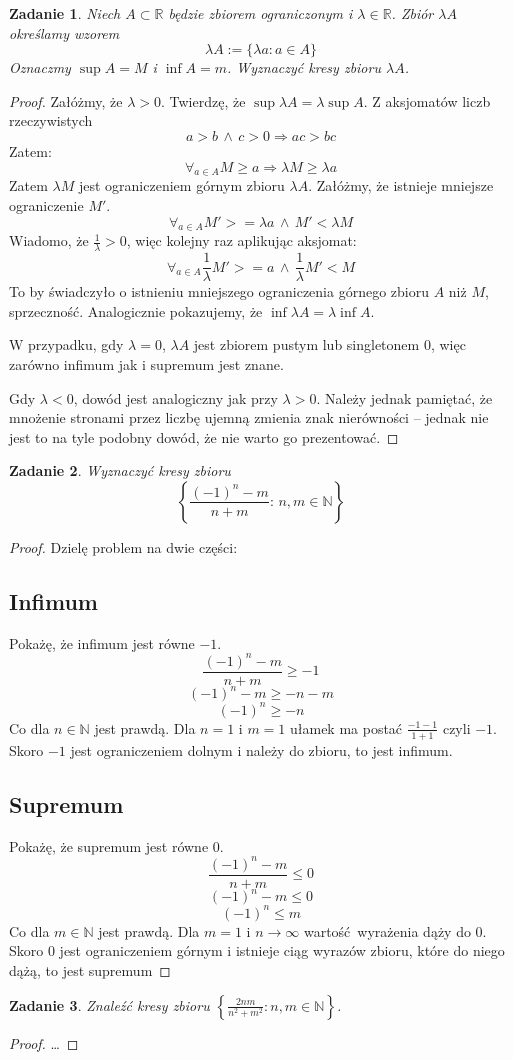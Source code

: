 \documentclass{article}
\newtheorem{problem}{Zadanie}
\begin{document}
\begin{problem}
    Niech $A \subset \mathbb{R}$ będzie zbiorem ograniczonym i
    $\lambda \in \mathbb{R}$. Zbiór $\lambda A$ określamy wzorem
    $$ \lambda A := \{ \lambda a : a \in A \} $$
    Oznaczmy $\sup A = M$ i $\inf A = m$. Wyznaczyć kresy zbioru
    $\lambda A$.
\end{problem}
\begin{proof}
    Załóżmy, że $\lambda > 0$.
    Twierdzę, że $\sup \lambda A = \lambda \sup A$.
    Z aksjomatów liczb rzeczywistych
    $$ a > b \,\wedge\, c > 0 \Rightarrow ac > bc $$
    Zatem:
    $$ \forall_{a \in A} M \geq a \Rightarrow \lambda M \geq \lambda a$$
    Zatem $\lambda M$ jest ograniczeniem górnym zbioru $\lambda A$.
    Załóżmy, że istnieje mniejsze ograniczenie $M'$.
    $$ \forall_{a \in A} M' >= \lambda a \,\wedge\, M' < \lambda M $$
    Wiadomo, że $\frac{1}{\lambda} > 0$, więc kolejny raz aplikując aksjomat:
    $$ \forall_{a \in A} \frac{1}{\lambda}M' >= a \,\wedge\, \frac{1}{\lambda}M' < M $$
    To by świadczyło o istnieniu mniejszego ograniczenia górnego zbioru $A$ niż
    $M$, sprzeczność. Analogicznie pokazujemy, że $\inf \lambda A = \lambda \inf A$.

    W przypadku, gdy $\lambda = 0$, $\lambda A $ jest zbiorem pustym lub
    singletonem $0$, więc zarówno infimum jak i supremum jest znane.

    Gdy $\lambda < 0$, dowód jest analogiczny jak przy $\lambda > 0$.
    Należy jednak pamiętać, że mnożenie stronami przez liczbę ujemną
    zmienia znak nierówności -- jednak nie jest to na tyle podobny dowód, że
    nie warto go prezentować.
\end{proof}

\begin {problem}
Wyznaczyć kresy zbioru
$$ \left\{ \frac{(-1)^n - m}{n + m} : \, n,m \in \mathbb{N} \right\} $$
\end{problem}
\begin{proof}
Dzielę problem na dwie części:\\
\subsection{Infimum}
Pokażę, że infimum jest równe $-1$.
$$ \frac{(-1)^n - m}{n + m} \geq -1$$
$$ (-1)^n - m \geq -n - m$$
$$ (-1)^n \geq -n $$
Co dla $n \in \mathbb{N}$ jest prawdą.
Dla $n = 1$ i $m = 1$ ułamek ma postać $ \frac{-1 - 1}{1 + 1} $ czyli $-1$.
Skoro $-1$ jest ograniczeniem dolnym i należy do zbioru, to jest infimum.
\subsection{Supremum}
Pokażę, że supremum jest równe $0$.
$$ \frac{(-1)^n - m}{n + m} \leq 0$$
$$ (-1)^n - m \leq 0$$
$$ (-1)^n \leq m$$
Co dla $m \in \mathbb{N}$ jest prawdą.
Dla $m = 1$ i $n \to \infty$ wartość wyrażenia dąży do $0$.
Skoro $0$ jest ograniczeniem górnym i istnieje ciąg wyrazów zbioru, które
do niego dążą, to jest supremum
\end{proof}

\begin{problem}
Znaleźć kresy zbioru $ \left\{ \frac{2nm}{n^2 + m^2} : n,m \in \mathbb{N}\right\}$.
\end{problem}
\begin{proof}
\dots
\end{proof}
\end{document}

